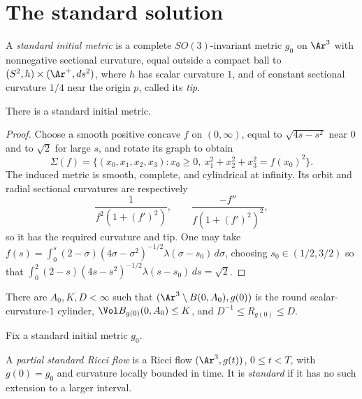 \chapter{The standard solution}
\label{chap:standard-solution}
\label{stdsolnsect}

\begin{definition}
\label{def:standard-initial-metric}
\label{defn:stinmetr}
A \emph{standard initial metric} is a complete $SO(3)$-invariant metric
$g_0$ on $\Ar^3$ with nonnegative sectional curvature, equal outside a
compact ball to $(S^2,h)\times(\Ar^+,ds^2)$, where $h$ has scalar
curvature $1$, and of constant sectional curvature $1/4$ near the origin
$p$, called its \emph{tip}.
\end{definition}

\begin{lemma}
\label{lem:existence-standard-initial-metric}
\label{stdinit}
There is a standard initial metric.
\end{lemma}
\begin{proof}
\sketch Choose a smooth positive concave $f$ on $(0,\infty)$, equal to
$\sqrt{4s-s^2}$ near $0$ and to $\sqrt2$ for large $s$, and rotate its
graph to obtain
\[
 \Sigma(f)=\{(x_0,x_1,x_2,x_3):x_0\ge0,\ x_1^2+x_2^2+x_3^2=f(x_0)^2\}.
\]
The induced metric is smooth, complete, and cylindrical at infinity. Its
orbit and radial sectional curvatures are respectively
\[
 \frac1{f^2(1+(f')^2)},\qquad\frac{-f''}{f(1+(f')^2)^2},
\]
so it has the required curvature and tip. One may take
$f(s)=\int_0^s(2-\sigma)(4\sigma-\sigma^2)^{-1/2}
\lambda(\sigma-s_0)\,d\sigma$, choosing $s_0\in(1/2,3/2)$ so that
$\int_0^2(2-s)(4s-s^2)^{-1/2}\lambda(s-s_0)\,ds=\sqrt2$.
\end{proof}

\begin{lemma}
\label{lem:standard-initial-metric-asymptotic-bounds}
\label{A_0}
There are $A_0,K,D<\infty$ such that $(\Ar^3\setminus B(0,A_0),g(0))$
is the round scalar-curvature-$1$ cylinder, $\Vol B_{g(0)}(0,A_0)\le K$,
and $D^{-1}\le R_{g(0)}\le D$.
\end{lemma}

Fix a standard initial metric $g_0$.

\begin{definition}
\label{def:standard-ricci-flow}
A \emph{partial standard Ricci flow} is a Ricci flow $(\Ar^3,g(t))$,
$0\le t<T$, with $g(0)=g_0$ and curvature locally bounded in time. It is
\emph{standard} if it has no such extension to a larger interval.
\end{definition}

